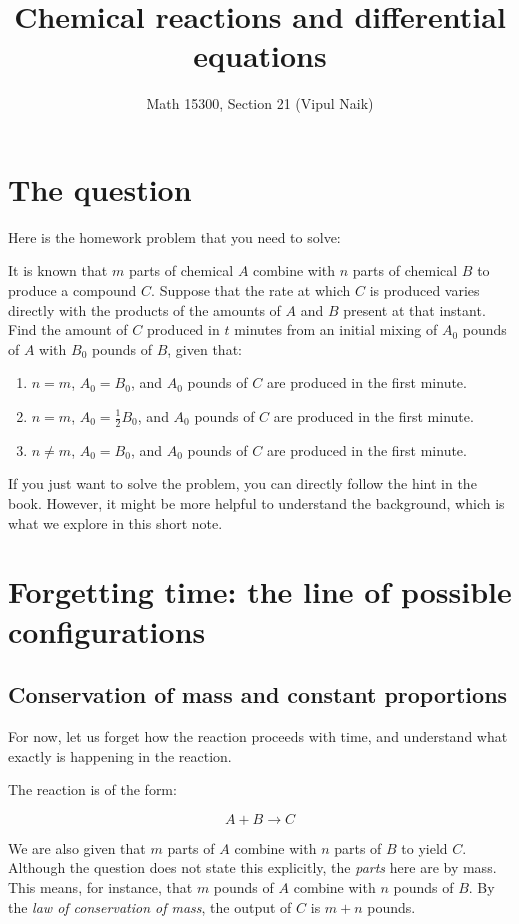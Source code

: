 \documentclass[10pt]{amsart}
\title{Chemical reactions and differential equations}
\author{Math 15300, Section 21 (Vipul Naik)}
\begin{document}
\maketitle

\section{The question}

Here is the homework problem that you need to solve:

It is known that $m$ parts of chemical $A$ combine with $n$ parts of
chemical $B$ to produce a compound $C$. Suppose that the rate at which
$C$ is produced varies directly with the products of the amounts of
$A$ and $B$ present at that instant. Find the amount of $C$ produced
in $t$ minutes from an initial mixing of $A_0$ pounds of $A$ with
$B_0$ pounds of $B$, given that:

\begin{enumerate}
\item $n = m$, $A_0 = B_0$, and $A_0$ pounds of $C$ are produced in
  the first minute.
\item $n = m$, $A_0 = \frac{1}{2} B_0$, and $A_0$ pounds of $C$ are
  produced in the first minute.
\item $n \ne m$, $A_0 = B_0$, and $A_0$ pounds of $C$ are produced in
  the first minute.
\end{enumerate}

If you just want to solve the problem, you can directly follow the
hint in the book. However, it might be more helpful to understand the
background, which is what we explore in this short note.

\section{Forgetting time: the line of possible configurations}

\subsection{Conservation of mass and constant proportions}

For now, let us forget how the reaction proceeds with time, and
understand what exactly is happening in the reaction.

The reaction is of the form:

$$A + B \to C$$

We are also given that $m$ parts of $A$ combine with $n$ parts of $B$
to yield $C$. Although the question does not state this explicitly,
the {\em parts} here are by mass. This means, for instance, that $m$
pounds of $A$ combine with $n$ pounds of $B$. By the {\em law of
conservation of mass}, the output of $C$ is $m + n$ pounds.
\end{document}
